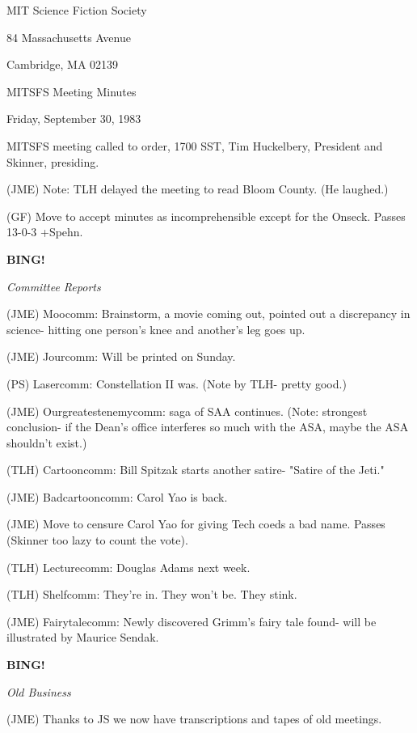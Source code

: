 \documentclass[12pt]{article}
\newcommand{\bing}{{\bf BING!} }
\newcommand{\goto}[1]{\bing \vskip 12pt \centerline{{\em{#1}}}}
\begin{document}
\begin{center}

MIT Science Fiction Society 

84 Massachusetts Avenue

Cambridge, MA 02139

\vspace{12pt}

MITSFS Meeting Minutes 

Friday, September 30, 1983

\end{center}
 
\vspace{18pt}

\setlength{\parskip}{6pt}

\noindent
MITSFS meeting called to order, 1700 SST,
Tim Huckelbery, President and Skinner, presiding.

(JME) Note: TLH delayed the meeting to read Bloom County. (He laughed.)

(GF) Move to accept minutes as incomprehensible except for the Onseck. Passes 13-0-3 +Spehn.

\goto{Committee Reports}

(JME) Moocomm: Brainstorm, a movie coming out, pointed out a discrepancy in science- hitting one person's knee and another's leg goes up.

(JME) Jourcomm: Will be printed on Sunday.

(PS) Lasercomm: Constellation II was. (Note by TLH- pretty good.)

(JME) Ourgreatestenemycomm: saga of SAA continues. (Note: strongest conclusion- if the Dean's office interferes so much with the ASA, maybe the ASA shouldn't exist.)

(TLH) Cartooncomm: Bill Spitzak starts another satire- "Satire of the Jeti."

(JME) Badcartooncomm: Carol Yao is back.

(JME) Move to censure Carol Yao for giving Tech coeds a bad name. Passes (Skinner too lazy to count the vote).

(TLH) Lecturecomm: Douglas Adams next week.

(TLH) Shelfcomm: They're in. They won't be. They stink.

(JME) Fairytalecomm: Newly discovered Grimm's fairy tale found- will be illustrated by Maurice Sendak.

\goto{Old Business}

(JME) Thanks to JS we now have transcriptions and tapes of old meetings.
\end{document}
